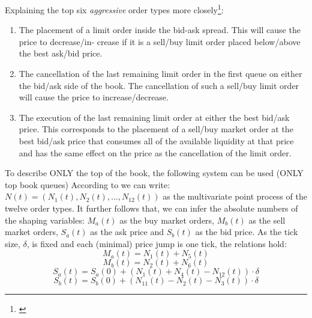 \documentclass[12pt,a4paper]{cau_thesis}
\begin{document}
Explaining the top six \emph{aggressive} order types more
closely\footnote{\cite[See ][, p.15]{oxford_hawkes_2020}}:
\begin{enumerate}
    \item The placement of a limit order inside the bid-ask spread. This will
          cause the price to decrease/in- crease if it is a sell/buy limit
          order placed below/above the best ask/bid price.
    \item The cancellation of the last remaining limit order in the first queue
          on either the bid/ask side of the book. The cancellation of such a
          sell/buy limit order will cause the price to increase/decrease.
    \item The execution of the last remaining limit order at either the best
          bid/ask price. This corresponds to the placement of a sell/buy market
          order at the best bid/ask price that consumes all of the available
          liquidity at that price and has the same effect on the price as the
          cancellation of the limit order.
\end{enumerate}
To describe ONLY the top of the book, the following system can be used (ONLY top book queues)
According to \cite{law2015pure} we can write: \(N(t) = (N_{1}(t),
N_{2}(t), \ldots, N_{12}(t))\) as the multivariate point process of
the twelve order types. It further follows that, we can infer the
absolute numbers of the shaping variables: \(M_{a}(t)\) as the buy
market orders, \(M_{b}(t)\) as the sell market orders, \(S_{a}(t)\)
as the ask price and \(S_{b}(t)\) as the bid price. As the tick size,
\(\delta\), is fixed and each (minimal) price jump is one tick, the
relations hold:
\begin{equation}
    M_{a}(t) = N_{1}(t) + N_{5}(t)
\end{equation}
\begin{equation}
    M_{b}(t) = N_{2}(t) + N_{6}(t)
\end{equation}
\begin{equation}
    S_{a}(t) = S_{a}(0) + (N_{1}(t) + N_{4}(t) - N_{12}(t)) \cdot \delta
\end{equation}
\begin{equation}
    S_{b}(t) = S_{b}(0) + (N_{11}(t) - N_{2}(t) - N_{3}(t)) \cdot \delta
\end{equation}
\end{document}
